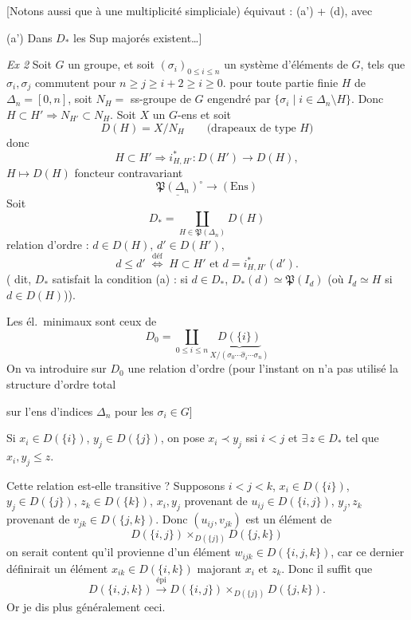 \documentclass[11pt,a4paper]{article}
\begin{document}
[Notons aussi que   à une multiplicité simpliciale) équivaut :
(a') + (d), avec

(a') Dans $D_*$ les Sup  majorés existent…]

\emph{Ex 2} Soit $G$ un groupe, et soit $(\sigma_i)_{0 \leqslant i
\leqslant n}$ un système d'éléments de $G$, tels que $\sigma_i,
\sigma_j$ commutent pour  $n \geqslant j \geqslant i+2
\geqslant i \geqslant 0$.  pour
toute partie finie $H$ de $\Delta_n = [0,n]$, soit \struck{\ill{}}
$N_H =$ ss-groupe de $G$ engendré par $\lbrace \sigma_i \mid i \in
\Delta_n \setminus H \rbrace$. Donc $H \subset H' \Rightarrow N_{H'}
\subset N_H$. Soit $X$ un $G$-ens et soit
\[
  D(H) = X / N_H \qquad \text{(drapeaux de type } H\text{)}
\]
donc
\[
  H \subset H' \Longrightarrow i^*_{H,H'} : D(H') \to D(H),
\]
$H \mapsto D(H)$ foncteur contravariant
\[
  \underline{\mathfrak{P}(\Delta_n)}^\circ \longrightarrow (\mathrm{Ens})
\]
Soit
\[
  D_* = \coprod_{H \in \mathfrak{P}(\Delta_n)} D(H)
\]
relation d'ordre : $d \in D(H)$, $d' \in D(H')$,
\[
  d \leqslant d' \;\overset{\text{déf}}{\Longleftrightarrow}\; H \subset
  H' \text{ et } d = i^*_{H,H'}(d').
\]
( dit, $D_*$ satisfait la condition (a) : si $d \in D_*$,
$D_*(d) \simeq \mathfrak{P}(I_d)$ (où $I_d \simeq H$ si $d \in D(H)$)).

Les él.\ minimaux sont ceux de
\[
  D_0 = \coprod_{0 \leqslant i \leqslant n}
  \underbrace{D(\lbrace i \rbrace)}_{X / (\sigma_0 \cdots \widehat{\sigma}_i
  \cdots \sigma_n)}
\]
On va introduire sur $D_0$ une relation d'ordre (pour l'instant on n'a pas
utilisé la structure d'ordre total

sur l'ens d'indices $\Delta_n$ pour les $\sigma_i \in G$]

Si \struck{\ill{}} $x_i \in D(\lbrace i \rbrace)$, $y_j \in D(\lbrace j
\rbrace)$, on pose $x_i \prec y_j$ ssi $i < j$ et $\exists\, z \in D_*$
tel que \struck{\ill{}} $x_i, y_j \leqslant z$.

Cette relation est-elle transitive ? Supposons $i < j < k$, $x_i \in
D(\lbrace i \rbrace)$, $y_j \in D(\lbrace j \rbrace)$, $z_k \in D(\lbrace
k \rbrace)$, \struck{\ill{}} $x_i, y_j$ provenant de $u_{ij} \in
D(\lbrace i, j \rbrace)$, $y_j, z_k$ provenant de $v_{jk} \in D(\lbrace
j, k \rbrace)$. Donc $(u_{ij}, v_{jk})$ est un élément de
\[
  D(\lbrace i, j \rbrace) \times_{D(\lbrace j \rbrace)} D(\lbrace j, k
  \rbrace)
\]
on serait content qu'il provienne d'un élément $w_{ijk} \in D(\lbrace i,
j, k \rbrace)$, car ce dernier définirait un élément \struck{\ill{}}
$x_{ik} \in D(\lbrace i, k \rbrace)$ majorant $x_i$ et
$z_k$. Donc \struck{\ill{}} il suffit que
\[
  D(\lbrace i, j, k \rbrace) \xrightarrow{\text{épi}} D(\lbrace i, j
  \rbrace) \times_{D(\lbrace j \rbrace)} D(\lbrace j, k \rbrace).
\]
Or je dis plus généralement ceci.
\end{document}
